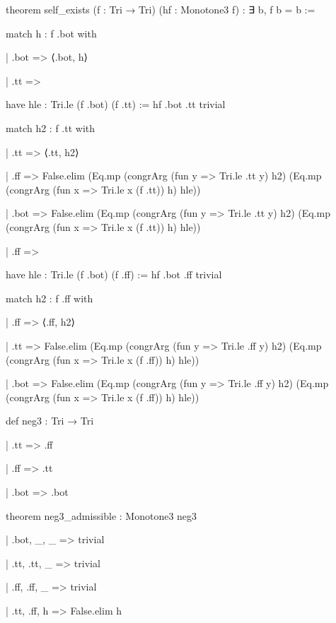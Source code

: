 \documentclass[10pt,twocolumn]{article}
\newenvironment{Shaded}{}{}
\newcommand{\NormalTok}[1]{#1}
\providecommand{\NormalTok}[1]{#1}
\providecommand{\NormalTok}[1]{#1}
\begin{document}
\begin{strip}
\begin{Shaded}
\begin{Highlighting}[]
\NormalTok{theorem self\_exists (f : Tri → Tri) (hf : Monotone3 f) : ∃ b, f b = b :=}

\NormalTok{  match h : f .bot with}

\NormalTok{  | .bot =\textgreater{} ⟨.bot, h⟩}

\NormalTok{  | .tt =\textgreater{}}

\NormalTok{    have hle : Tri.le (f .bot) (f .tt) := hf .bot .tt trivial}

\NormalTok{    match h2 : f .tt with}

\NormalTok{    | .tt =\textgreater{} ⟨.tt, h2⟩}

\NormalTok{    | .ff =\textgreater{} False.elim (Eq.mp (congrArg (fun y =\textgreater{} Tri.le .tt y) h2) (Eq.mp (congrArg (fun x =\textgreater{} Tri.le x (f .tt)) h) hle))}

\NormalTok{    | .bot =\textgreater{} False.elim (Eq.mp (congrArg (fun y =\textgreater{} Tri.le .tt y) h2) (Eq.mp (congrArg (fun x =\textgreater{} Tri.le x (f .tt)) h) hle))}

\NormalTok{  | .ff =\textgreater{}}

\NormalTok{    have hle : Tri.le (f .bot) (f .ff) := hf .bot .ff trivial}

\NormalTok{    match h2 : f .ff with}

\NormalTok{    | .ff =\textgreater{} ⟨.ff, h2⟩}

\NormalTok{    | .tt =\textgreater{} False.elim (Eq.mp (congrArg (fun y =\textgreater{} Tri.le .ff y) h2) (Eq.mp (congrArg (fun x =\textgreater{} Tri.le x (f .ff)) h) hle))}

\NormalTok{    | .bot =\textgreater{} False.elim (Eq.mp (congrArg (fun y =\textgreater{} Tri.le .ff y) h2) (Eq.mp (congrArg (fun x =\textgreater{} Tri.le x (f .ff)) h) hle))}

\NormalTok{def neg3 : Tri → Tri}

\NormalTok{  | .tt =\textgreater{} .ff}

\NormalTok{  | .ff =\textgreater{} .tt}

\NormalTok{  | .bot =\textgreater{} .bot}

\NormalTok{theorem neg3\_admissible : Monotone3 neg3}

\NormalTok{  | .bot, \_, \_ =\textgreater{} trivial}

\NormalTok{  | .tt, .tt, \_ =\textgreater{} trivial}

\NormalTok{  | .ff, .ff, \_ =\textgreater{} trivial}

\NormalTok{  | .tt, .ff, h =\textgreater{} False.elim h}


\end{Highlighting}
\end{Shaded}
\end{strip}
\end{document}
